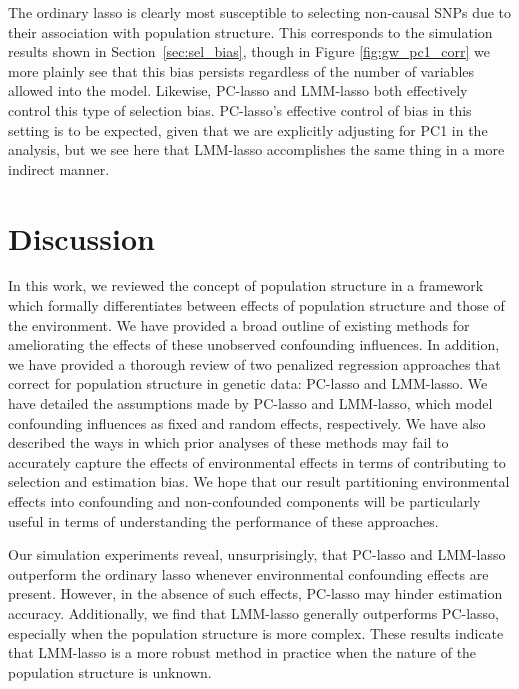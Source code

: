 The ordinary lasso is clearly most susceptible to selecting non-causal SNPs due to their association with population structure. This corresponds to the simulation results shown in Section~\ref{sec:sel_bias}, though in Figure \ref{fig:gw_pc1_corr} we more plainly see that this bias persists regardless of the number of variables allowed into the model. Likewise, PC-lasso and LMM-lasso both effectively control this type of selection bias. PC-lasso's effective control of bias in this setting is to be expected, given that we are explicitly adjusting for PC1 in the analysis, but we see here that LMM-lasso accomplishes the same thing in a more indirect manner.

\section{Discussion} \label{sec:discussion}

In this work, we reviewed the concept of population structure in a framework which formally differentiates between effects of population structure and those of the environment. We have provided a broad outline of existing  methods for ameliorating the effects of these unobserved confounding influences. In addition, we have provided a thorough review of two penalized regression approaches that correct for population structure in genetic data: PC-lasso and LMM-lasso. We have detailed the assumptions made by PC-lasso and LMM-lasso, which model confounding influences as fixed and random effects, respectively. We have also described the ways in which prior analyses of these methods may fail to accurately capture the effects of environmental effects in terms of contributing to selection and estimation bias. We hope that our result partitioning environmental effects into confounding and non-confounded components will be particularly useful in terms of understanding the performance of these approaches.

Our simulation experiments reveal, unsurprisingly, that PC-lasso and LMM-lasso outperform the ordinary lasso whenever environmental confounding effects are present. However, in the absence of such effects, PC-lasso may hinder estimation accuracy. Additionally, we find that LMM-lasso generally outperforms PC-lasso, especially when the population structure is more complex. These results indicate that LMM-lasso is a more robust method in practice when the nature of the population structure is unknown.

